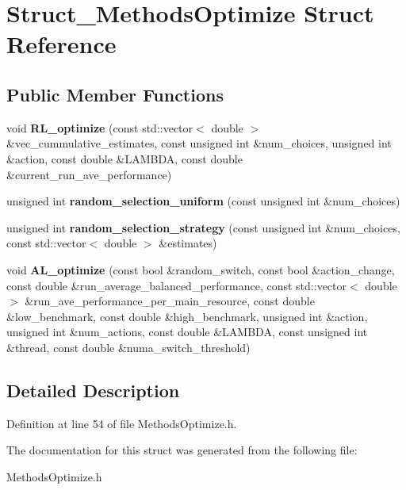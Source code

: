\hypertarget{structStruct__MethodsOptimize}{\section{Struct\-\_\-\-Methods\-Optimize Struct Reference}
\label{structStruct__MethodsOptimize}
}
\subsection*{Public Member Functions}
\begin{DoxyCompactItemize}
\item 
\hypertarget{structStruct__MethodsOptimize_aae92e8b55e02d8f476c70fd84a817b2d}{void {\bfseries R\-L\-\_\-optimize} (const std\-::vector$<$ double $>$ \&vec\-\_\-cummulative\-\_\-estimates, const unsigned int \&num\-\_\-choices, unsigned int \&action, const double \&L\-A\-M\-B\-D\-A, const double \&current\-\_\-run\-\_\-ave\-\_\-performance)}\label{structStruct__MethodsOptimize_aae92e8b55e02d8f476c70fd84a817b2d}

\item 
\hypertarget{structStruct__MethodsOptimize_a02f7220d538eae22064174816dd73bf6}{unsigned int {\bfseries random\-\_\-selection\-\_\-uniform} (const unsigned int \&num\-\_\-choices)}\label{structStruct__MethodsOptimize_a02f7220d538eae22064174816dd73bf6}

\item 
\hypertarget{structStruct__MethodsOptimize_af46b3c9b62e65360adb3ac65d7ecd8d3}{unsigned int {\bfseries random\-\_\-selection\-\_\-strategy} (const unsigned int \&num\-\_\-choices, const std\-::vector$<$ double $>$ \&estimates)}\label{structStruct__MethodsOptimize_af46b3c9b62e65360adb3ac65d7ecd8d3}

\item 
\hypertarget{structStruct__MethodsOptimize_aec0f2037974da6b68e4e0fa7f84b8fa8}{void {\bfseries A\-L\-\_\-optimize} (const bool \&random\-\_\-switch, const bool \&action\-\_\-change, const double \&run\-\_\-average\-\_\-balanced\-\_\-performance, const std\-::vector$<$ double $>$ \&run\-\_\-ave\-\_\-performance\-\_\-per\-\_\-main\-\_\-resource, const double \&low\-\_\-benchmark, const double \&high\-\_\-benchmark, unsigned int \&action, unsigned int \&num\-\_\-actions, const double \&L\-A\-M\-B\-D\-A, const unsigned int \&thread, const double \&numa\-\_\-switch\-\_\-threshold)}\label{structStruct__MethodsOptimize_aec0f2037974da6b68e4e0fa7f84b8fa8}

\end{DoxyCompactItemize}


\subsection{Detailed Description}


Definition at line 54 of file Methods\-Optimize.\-h.



The documentation for this struct was generated from the following file\-:\begin{DoxyCompactItemize}
\item 
Methods\-Optimize.\-h\end{DoxyCompactItemize}
